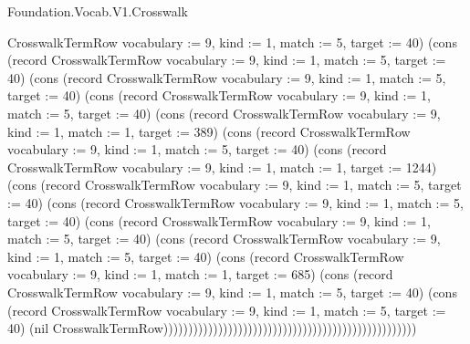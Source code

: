 \begin{lexlean}{Foundation.Vocab.V1.Crosswalk}
\begin{semanticmodule}
{CrosswalkTermRow {vocabulary := 9, kind := 1, match := 5, target := 40}) (cons (record CrosswalkTermRow {vocabulary := 9, kind := 1, match := 5, target := 40}) (cons (record CrosswalkTermRow {vocabulary := 9, kind := 1, match := 5, target := 40}) (cons (record CrosswalkTermRow {vocabulary := 9, kind := 1, match := 5, target := 40}) (cons (record CrosswalkTermRow {vocabulary := 9, kind := 1, match := 1, target := 389}) (cons (record CrosswalkTermRow {vocabulary := 9, kind := 1, match := 5, target := 40}) (cons (record CrosswalkTermRow {vocabulary := 9, kind := 1, match := 1, target := 1244}) (cons (record CrosswalkTermRow {vocabulary := 9, kind := 1, match := 5, target := 40}) (cons (record CrosswalkTermRow {vocabulary := 9, kind := 1, match := 5, target := 40}) (cons (record CrosswalkTermRow {vocabulary := 9, kind := 1, match := 5, target := 40}) (cons (record CrosswalkTermRow {vocabulary := 9, kind := 1, match := 5, target := 40}) (cons (record CrosswalkTermRow {vocabulary := 9, kind := 1, match := 1, target := 685}) (cons (record CrosswalkTermRow {vocabulary := 9, kind := 1, match := 5, target := 40}) (cons (record CrosswalkTermRow {vocabulary := 9, kind := 1, match := 5, target := 40}) (nil CrosswalkTermRow)))))))))))))))))))))))))))))))))))))))))))))))))))
}


\end{semanticmodule}
\end{lexlean}
